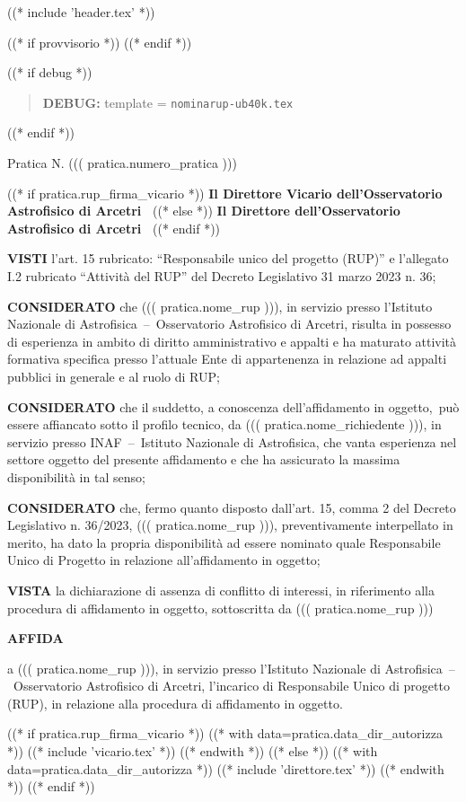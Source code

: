 
((* include 'header.tex' *))

((* if provvisorio *))
((* endif *))


\topaddr
((* if debug *))
\begin{quotation}
	\textbf{DEBUG:} template = \texttt{nominarup-ub40k.tex}
\end{quotation}
((* endif *))

Pratica N. ((( pratica.numero_pratica )))


\begin{center}
((* if pratica.rup_firma_vicario *))
\textbf{Il Direttore Vicario dell’Osservatorio Astrofisico di Arcetri }
((* else *))
\textbf{Il Direttore dell’Osservatorio Astrofisico di Arcetri }
((* endif *))
\end{center}

\textbf{VISTI}	l’art. 15 rubricato: ``Responsabile unico del progetto (RUP)'' e l’allegato I.2 rubricato
``Attività del RUP'' del Decreto Legislativo 31 marzo 2023 n. 36;

\textbf{CONSIDERATO} 	che ((( pratica.nome_rup ))), in servizio presso l’Istituto Nazionale di
Astrofisica~–~Osservatorio Astrofisico di Arcetri, risulta in possesso di esperienza in ambito di diritto
amministrativo e appalti e ha maturato attività formativa specifica presso l’attuale Ente di appartenenza
in relazione ad appalti pubblici in generale e al ruolo di RUP;

\textbf{CONSIDERATO} che il suddetto, a conoscenza dell’affidamento in oggetto, può essere affiancato sotto il
profilo tecnico, da ((( pratica.nome_richiedente ))), in servizio presso INAF~–~Istituto Nazionale di
Astrofisica, che vanta esperienza nel settore oggetto del presente affidamento e che ha assicurato la
massima disponibilità in tal senso;

\textbf{CONSIDERATO} 	che, fermo quanto disposto dall’art. 15, comma 2 del Decreto Legislativo n. 36/2023,
((( pratica.nome_rup ))), preventivamente interpellato in merito, ha dato la propria disponibilità ad
essere nominato quale Responsabile Unico di Progetto in relazione all’affidamento in oggetto;

\textbf{VISTA}	la dichiarazione di assenza di conflitto di interessi, in riferimento alla procedura di affidamento
in oggetto, sottoscritta da ((( pratica.nome_rup )))

\begin{center}
	\textbf{AFFIDA}
\end{center}

a ((( pratica.nome_rup ))), in servizio presso l’Istituto Nazionale di Astrofisica~–~Osservatorio
Astrofisico di Arcetri, l’incarico di Responsabile Unico di progetto (RUP), in relazione alla procedura
di affidamento in oggetto.

((* if pratica.rup_firma_vicario *))
((* with data=pratica.data_dir_autorizza *))
((* include 'vicario.tex' *))
((* endwith *))
((* else *))
((* with data=pratica.data_dir_autorizza *))
((* include 'direttore.tex' *))
((* endwith *))
((* endif *))


